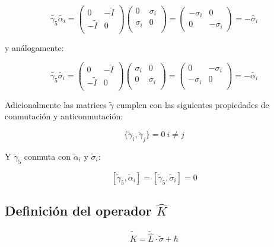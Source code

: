 \documentclass[a4paper, 12pt]{article} %
\begin{document}
\[
\widetilde{\gamma_5}\widetilde{\alpha_i} = 
\begin{pmatrix} 
0 & - \widetilde{I} \\
-\widetilde{I} & 0 \\
\end{pmatrix} 
\begin{pmatrix} 
0 & \sigma_i \\
\sigma_i & 0 \\
\end{pmatrix} 
= 
\begin{pmatrix}
-\sigma_i & 0 \\
0 & -\sigma_i
\end{pmatrix}
= -\widetilde{\sigma_i}
\]

y an\'alogamente:

\[
\widetilde{\gamma_5}\widetilde{\sigma_i} = 
\begin{pmatrix} 
0 & - \widetilde{I} \\
-\widetilde{I} & 0 \\
\end{pmatrix} 
\begin{pmatrix} 
\sigma_i & 0 \\
0 & \sigma_i  \\
\end{pmatrix} 
= 
\begin{pmatrix}
0 & -\sigma_i \\
-\sigma_i & 0 \\
\end{pmatrix}
= -\widetilde{\alpha_i}
\]

Adicionalmente las matrices $\widetilde{\gamma}$ cumplen con las siguientes
propiedades de conmutaci\'on y anticonmutaci\'on:

\[
\{ \widetilde{\gamma}_i, \widetilde{\gamma}_j \} = 0 \ i \neq j
\]

Y $\widetilde{\gamma}_5$ conmuta con $\widetilde{\alpha}_i$ y $\widetilde{\sigma}_i$: 

\[
[\widetilde{\gamma}_5, \widetilde{\alpha}_i] = [\widetilde{\gamma}_5,\widetilde{\sigma}_i] = 0
\]

\subsection{Definici\'on del operador $\hat{K}$}\label{sec:k}

\begin{equation}
\widetilde{\hat{K}} = \widetilde{\hat{L}}\cdot \widetilde{\sigma} + \hbar
\end{equation}
\end{document}
